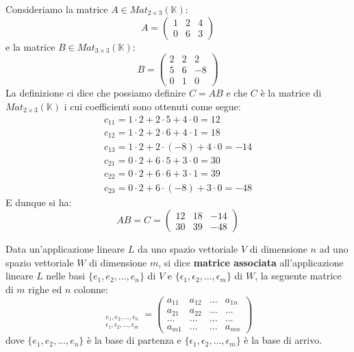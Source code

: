 \begin{example}
	Consideriamo la matrice $A \in Mat_{2 \times 3}(\mathbb{K})$:
	\begin{equation*}
		A = \begin{pmatrix}
			1 & 2 & 4 \\
			0 & 6 & 3
		\end{pmatrix}
	\end{equation*}
	e la matrice $B \in Mat_{3 \times 3}(\mathbb{K})$:
	\begin{equation*}
		B = \begin{pmatrix}
			2 & 2 & 2  \\
			5 & 6 & -8 \\
			0 & 1 & 0
		\end{pmatrix}
	\end{equation*}
	La definizione ci dice che possiamo definire $C = AB$ e che $C$ \`e la matrice di
	$Mat_{2 \times 3}(\mathbb{K})$ i cui coefficienti sono ottenuti come segue:
	\begin{gather*}
		c_{11} = 1 \cdot 2 + 2 \cdot 5 + 4 \cdot 0 = 12 \\
		c_{12} = 1 \cdot 2 + 2 \cdot 6 + 4 \cdot 1 = 18 \\
		c_{13} = 1 \cdot 2 + 2 \cdot (-8) + 4 \cdot 0 = -14 \\
		c_{21} = 0 \cdot 2 + 6 \cdot 5 + 3 \cdot 0 = 30 \\
		c_{22} = 0 \cdot 2 + 6 \cdot 6 + 3 \cdot 1 = 39 \\
		c_{23} = 0 \cdot 2 + 6 \cdot (-8) + 3 \cdot 0 = -48
	\end{gather*}
	E dunque si ha:
	\begin{equation*}
		AB = C = \begin{pmatrix}
			12 & 18 & -14 \\
			30 & 39 & -48
		\end{pmatrix}
	\end{equation*}
\end{example}

\begin{definition}
	Data un'applicazione lineare $L$ da uno spazio vettoriale $V$ di
	dimensione $n$ ad uno spazio vettoriale $W$ di dimensione $m$, si dice
	\textbf{matrice associata} all'applicazione lineare $L$ nelle basi
	$\{e_1, e_2, \dots, e_n\}$ di $V$ e
	$\{\epsilon_1, \epsilon_2, \dots, \epsilon_m\}$ di $W$, la seguente
	matrice di $m$ righe ed $n$ colonne:
	\begin{equation*}
		[L]_{\substack{
				e_1, e_2, \dots, e_n\\
				\epsilon_1, \epsilon_2, \dots, \epsilon_m
			}} = \begin{pmatrix}
			a_{11} & a_{12} & \dots & a_{1n} \\
			a_{21} & a_{22} & \dots & \dots  \\
			\dots  & \dots  & \dots & \dots  \\
			a_{m1} & \dots  & \dots & a_{mn}
		\end{pmatrix}
	\end{equation*}
	dove $\{e_1, e_2, \dots, e_n\}$ \`e la base di partenza e
	$\{\epsilon_1, \epsilon_2, \dots, \epsilon_m\}$ \`e la base di arrivo.
\end{definition}

